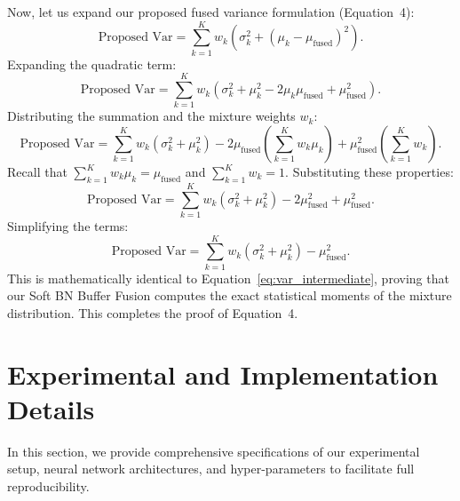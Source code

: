 \documentclass{article}
\theoremstyle{plain}
\theoremstyle{definition}
\theoremstyle{remark}
\begin{document}
Now, let us expand our proposed fused variance formulation (Equation~4):
\begin{equation}
\text{Proposed Var} = \sum_{k=1}^K w_k \left( \sigma_k^2 + (\mu_k - \mu_{\text{fused}})^2 \right).
\end{equation}
Expanding the quadratic term:
\begin{equation}
\text{Proposed Var} = \sum_{k=1}^K w_k \left( \sigma_k^2 + \mu_k^2 - 2 \mu_k \mu_{\text{fused}} + \mu_{\text{fused}}^2 \right).
\end{equation}
Distributing the summation and the mixture weights $w_k$:
\begin{equation}
\text{Proposed Var} = \sum_{k=1}^K w_k (\sigma_k^2 + \mu_k^2) - 2 \mu_{\text{fused}} \left( \sum_{k=1}^K w_k \mu_k \right) + \mu_{\text{fused}}^2 \left( \sum_{k=1}^K w_k \right).
\end{equation}
Recall that $\sum_{k=1}^K w_k \mu_k = \mu_{\text{fused}}$ and $\sum_{k=1}^K w_k = 1$. Substituting these properties:
\begin{equation}
\text{Proposed Var} = \sum_{k=1}^K w_k (\sigma_k^2 + \mu_k^2) - 2 \mu_{\text{fused}}^2 + \mu_{\text{fused}}^2.
\end{equation}
Simplifying the terms:
\begin{equation}
\text{Proposed Var} = \sum_{k=1}^K w_k (\sigma_k^2 + \mu_k^2) - \mu_{\text{fused}}^2.
\end{equation}
This is mathematically identical to Equation~\ref{eq:var_intermediate}, proving that our Soft BN Buffer Fusion computes the exact statistical moments of the mixture distribution. This completes the proof of Equation~4.


\section{Experimental and Implementation Details}
\label{app:implementation_details}

In this section, we provide comprehensive specifications of our experimental setup, neural network architectures, and hyper-parameters to facilitate full reproducibility.
\end{document}
